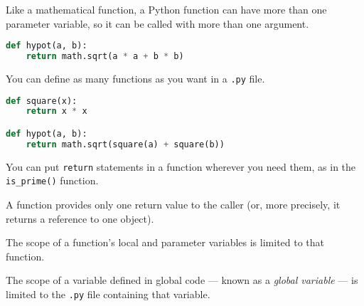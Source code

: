 \documentclass[8pt,a4paper,compress,handout]{beamer}
\begin{document}
\begin{frame}[fragile]
Like a mathematical function, a Python function can have more than one parameter variable, so it can be called with more than one argument.
\begin{lstlisting}[language=Python]
def hypot(a, b):
    return math.sqrt(a * a + b * b)
\end{lstlisting}

\bigskip

You can define as many functions as you want in a \lstinline{.py} file.

\begin{lstlisting}[language=Python]
def square(x):
    return x * x

def hypot(a, b):
    return math.sqrt(square(a) + square(b))
\end{lstlisting}

\bigskip

You can put \lstinline{return} statements in a function wherever you need them, as in the \lstinline{is_prime()} function.

\bigskip

A function provides only one return value to the caller (or, more precisely, it returns a reference to one object).

\bigskip

The scope of a function's local and parameter variables is limited to that function.

\bigskip

The scope of a variable defined in global code --- known as a \emph{global variable} --- is limited to the \lstinline{.py} file containing that variable. 
\end{frame}
\end{document}
